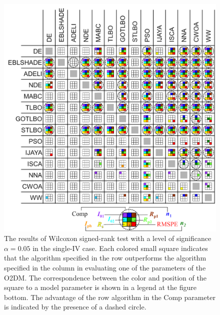 \documentclass[a4paper,fleqn]{cas-dc}
\begin{document}
\begin{figure}[]
	\centering
		\includegraphics[width=1.0\columnwidth]{Fig4}
	  \caption{The results of Wilcoxon signed-rank test with a level of significance $\alpha = 0.05$ in the single-IV case.
               Each colored small square indicates that the algorithm specified in the row outperforms the algorithm
               specified in the column in evaluating one of the parameters of the O2DM.
               The correspondence between the color and position of the square to a model parameter
               is shown in a legend at the figure bottom.
               The advantage of the row algorithm in the Comp parameter is indicated by the presence of a dashed circle.}\label{figWilSingleIV}
\end{figure}
\end{document}
